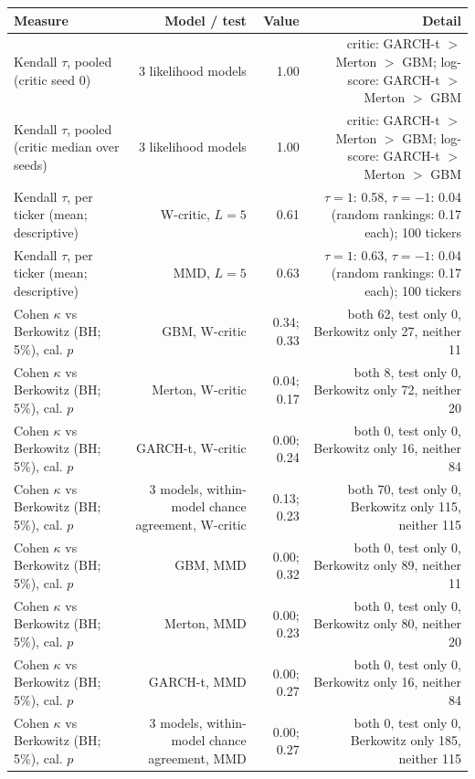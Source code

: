 \begin{tabular}{lrrr}
\toprule
Measure & Model / test & Value & Detail \\
\midrule
Kendall $\tau$, pooled (critic seed 0) & 3 likelihood models & 1.00 & critic: GARCH-t $>$ Merton $>$ GBM; log-score: GARCH-t $>$ Merton $>$ GBM \\
Kendall $\tau$, pooled (critic median over seeds) & 3 likelihood models & 1.00 & critic: GARCH-t $>$ Merton $>$ GBM; log-score: GARCH-t $>$ Merton $>$ GBM \\
Kendall $\tau$, per ticker (mean; descriptive) & W-critic, $L=5$ & 0.61 & $\tau=1$: 0.58, $\tau=-1$: 0.04 (random rankings: 0.17 each); 100 tickers \\
Kendall $\tau$, per ticker (mean; descriptive) & MMD, $L=5$ & 0.63 & $\tau=1$: 0.63, $\tau=-1$: 0.04 (random rankings: 0.17 each); 100 tickers \\
Cohen $\kappa$ vs Berkowitz (BH; 5\%), cal. $p$ & GBM, W-critic & 0.34; 0.33 & both 62, test only 0, Berkowitz only 27, neither 11 \\
Cohen $\kappa$ vs Berkowitz (BH; 5\%), cal. $p$ & Merton, W-critic & 0.04; 0.17 & both 8, test only 0, Berkowitz only 72, neither 20 \\
Cohen $\kappa$ vs Berkowitz (BH; 5\%), cal. $p$ & GARCH-t, W-critic & 0.00; 0.24 & both 0, test only 0, Berkowitz only 16, neither 84 \\
Cohen $\kappa$ vs Berkowitz (BH; 5\%), cal. $p$ & 3 models, within-model chance agreement, W-critic & 0.13; 0.23 & both 70, test only 0, Berkowitz only 115, neither 115 \\
Cohen $\kappa$ vs Berkowitz (BH; 5\%), cal. $p$ & GBM, MMD & 0.00; 0.32 & both 0, test only 0, Berkowitz only 89, neither 11 \\
Cohen $\kappa$ vs Berkowitz (BH; 5\%), cal. $p$ & Merton, MMD & 0.00; 0.23 & both 0, test only 0, Berkowitz only 80, neither 20 \\
Cohen $\kappa$ vs Berkowitz (BH; 5\%), cal. $p$ & GARCH-t, MMD & 0.00; 0.27 & both 0, test only 0, Berkowitz only 16, neither 84 \\
Cohen $\kappa$ vs Berkowitz (BH; 5\%), cal. $p$ & 3 models, within-model chance agreement, MMD & 0.00; 0.27 & both 0, test only 0, Berkowitz only 185, neither 115 \\
\bottomrule
\end{tabular}
